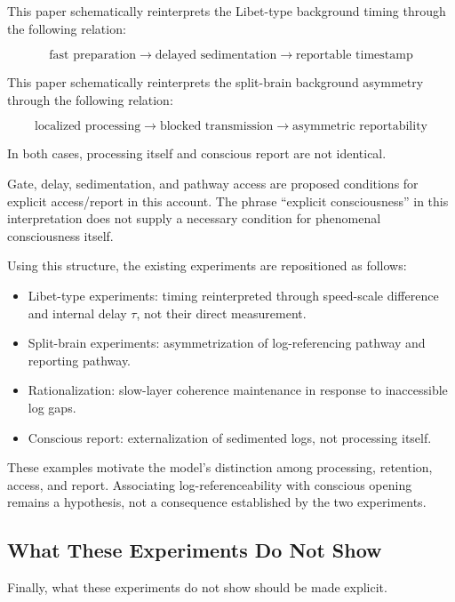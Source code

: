 This paper schematically reinterprets the Libet-type background timing through the following relation:

\begin{equation}
\text{fast preparation} \rightarrow \text{delayed sedimentation} \rightarrow \text{reportable timestamp}
\end{equation}

This paper schematically reinterprets the split-brain background asymmetry through the following relation:

\begin{equation}
\text{localized processing} \rightarrow \text{blocked transmission} \rightarrow \text{asymmetric reportability}
\end{equation}

In both cases, processing itself and conscious report are not identical.

Gate, delay, sedimentation, and pathway access are proposed conditions for explicit access/report in this account. The phrase ``explicit consciousness'' in this interpretation does not supply a necessary condition for phenomenal consciousness itself.

Using this structure, the existing experiments are repositioned as follows:

\begin{itemize}
\item Libet-type experiments: timing reinterpreted through speed-scale difference and internal delay $\tau$, not their direct measurement.
\item Split-brain experiments: asymmetrization of log-referencing pathway and reporting pathway.
\item Rationalization: slow-layer coherence maintenance in response to inaccessible log gaps.
\item Conscious report: externalization of sedimented logs, not processing itself.
\end{itemize}

These examples motivate the model's distinction among processing, retention, access, and report. Associating log-referenceability with conscious opening remains a hypothesis, not a consequence established by the two experiments.

\subsection{What These Experiments Do Not Show}


Finally, what these experiments do not show should be made explicit.

